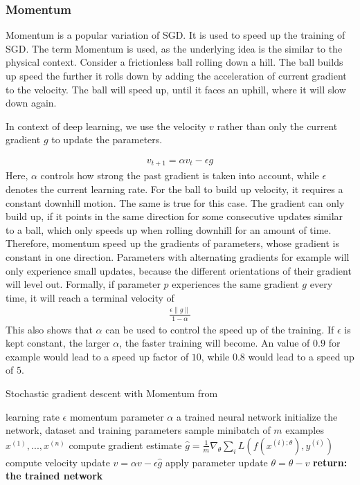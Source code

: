 \subsubsection{Momentum}\label{sub:Momentum}
Momentum is a popular variation of SGD. It is used to speed up the training of
SGD. The term Momentum is used, as the underlying idea is the similar to the
physical context. Consider a frictionless ball rolling down a hill. The ball
builds up speed the further it rolls down by adding the acceleration of current
gradient to the velocity. The ball will speed up, until it faces an uphill,
where it will slow down again.

In context of deep learning, we use the velocity $v$ rather than only the
current gradient $g$ to update the parameters.

\begin{align}
    v_{t+1}=\alpha v_t - \epsilon g
\end{align}
Here, $\alpha$ controls how strong the past gradient is taken into account,
while $\epsilon$ denotes the current learning rate. For the ball to build up
velocity, it requires a constant downhill motion. The same is true for this
case. The gradient can only build up, if it points in the same direction for
some consecutive updates similar to a ball, which only speeds up when rolling
downhill for an amount of time. Therefore, momentum speed up the gradients of
parameters, whose gradient is constant in one direction. Parameters with
alternating gradients for example will only experience small updates, because the
different orientations of their gradient will level out. Formally, if parameter
$p$ experiences the same gradient $g$ every time, it will reach a terminal velocity
of
\begin{align}
    \frac{\epsilon \lVert g \rVert}{1-\alpha}
\end{align}
This also shows that $\alpha$ can be used to control the speed up of the
training. If $\epsilon$ is kept constant, the larger $\alpha$, the faster
training will become. An value of $0.9$ for example would lead to a speed up
factor of $10$, while $0.8$ would lead to a speed up of $5$.

\begin{algorithm}
    \begin{algorithmic}[1]
        \caption{Stochastic gradient descent with Momentum from \cite{Goodfellow-et-al-2016}}
        \REQUIRE learning rate $\epsilon$
        \REQUIRE momentum parameter $\alpha$
        \ENSURE a trained neural network
        \STATE initialize the network, dataset and training parameters
            \STATE sample minibatch of $m$ examples ${x^{(1)}, ... ,x^{(n)}}$
            \STATE compute gradient estimate $\hat{g}=\frac{1}{m} \nabla_\theta \sum_i L(f(x^{(i);\theta}),y^{(i)})$
            \STATE compute velocity update $v=\alpha v - \epsilon \hat{g}$
            \STATE apply parameter update $\theta=\theta-v$
        \ENDWHILE
        \STATE \textbf{return: the trained network}
    \end{algorithmic}
\end{algorithm}

